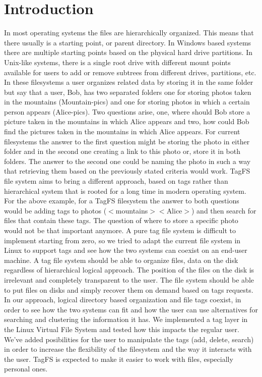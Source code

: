 \section{Introduction}
In most operating systems the files are hierarchically organized. 
This means that there usually is a starting point, or parent directory. 
In Windows based systems there are multiple starting points 
based on the physical hard drive partitions. In Unix-like systems, 
there is a single root drive with different mount points available for users
to add or remove subtrees from different drives, partitions, etc. 
In these filesystems a user organizes related data by storing it in the same 
folder but say that a user, Bob, has two separated folders one for storing
photos taken in the mountains (Mountain-pics) and one for storing photos in which 
a certain person appears (Alice-pics). Two questions arise, one, where should 
Bob store a picture taken in the mountains in which Alice appears and two, how 
could Bob find the pictures taken in the mountains in which Alice appears. For 
current
filesystems the answer to the first question might be storing the photo in either
folder and in the second one creating a link to this photo or, store it in both
folders. The answer to the second one could be naming the photo in such a way
that retrieving them based on the previously stated criteria would work. 
TagFS file system aims to bring a different approach, based on tags rather than 
hierarchical system that is rooted for a long time in modern operating system. 
For the above example, for a TagFS filesystem the answer to both questions would
be adding tags to photos ($<$mountains$><$Alice$>$) and then search for files that 
contain these tags. The question of where to store a specific photo 
 would not be that important anymore. 
A pure tag file system is difficult to implement starting from zero, so we tried
to adapt the current file system in Linux to support tags and see how the two 
systems can coexist on an end-user machine. 
A tag file system should be able to organize files, data on the disk regardless of 
hierarchical logical approach. The position of the files on the disk is irrelevant and 
completely transparent to the user. The file system should be able to put files on disks
and simply recover them on demand based on tags requests. 
In our approach, logical directory based organization and file tags coexist, in order
to see how the two systems can fit and how the user can use alternatives for searching
and clustering the information it has. 
We implemented a tag layer in the Linux Virtual File System and tested how this impacts 
the regular user. We've added posibilities for the user to manipulate the tags (add, delete,
 search) in order to increase the flexibility of the filesystem and the way it interacts with the user.
TagFS is expected to make it easier to work with files, especially personal ones.

